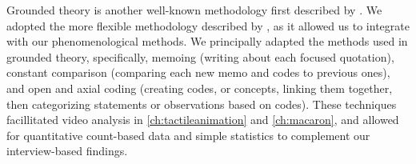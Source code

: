 Grounded theory is another well-known methodology first described by \citet{glaser1966awareness}.
We adopted the more flexible methodology described by \citet{Corbin2008}, as it allowed us to integrate with our phenomenological methods.
We principally adapted the methods used in grounded theory, specifically, memoing (writing about each focused quotation), constant comparison (comparing each new memo and codes to previous ones), and open and axial coding (creating codes, or concepts, linking them together, then categorizing statements or observations based on codes).
These techniques facillitated video analysis in \autoref{ch:tactileanimation} and \autoref{ch:macaron}, and allowed for quantitative count-based data and simple statistics to complement our interview-based findings.


